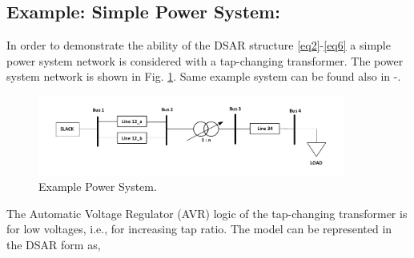 \documentclass{article}	%
\begin{document}
\subsection{Example: Simple Power System:}

In order to demonstrate the ability of the DSAR structure \eqref{eq2}-\eqref{eq6} a simple power system network is considered with a tap-changing transformer. The power system network is shown in Fig. \ref{fig:pse1}. Same example system can be found also in \cite{H1}-\cite{turhum}.

\begin{figure}[H]
\centering
 \includegraphics[width=0.9\textwidth]{PowerSystem_tap}
    \caption{Example Power System.}
\label{fig:pse1}
\end{figure}

The Automatic Voltage Regulator (AVR) logic of the tap-changing transformer is for low voltages, i.e., for increasing tap ratio. The model can be represented in the DSAR form as,
\end{document}
